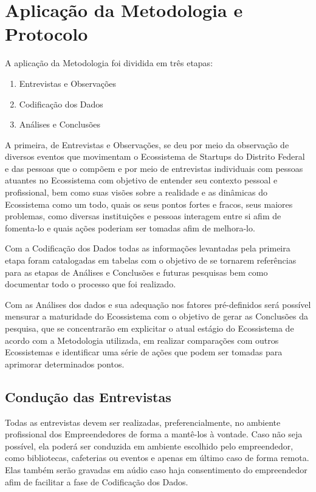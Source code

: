\section{Aplicação da Metodologia e Protocolo}
\label{subsection:aplicacao_da_metodologia}

A aplicação da Metodologia foi dividida em três etapas:

\begin{enumerate}
  \item Entrevistas e Observações
  \item Codificação dos Dados
  \item Análises e Conclusões
\end{enumerate}

A primeira, de Entrevistas e Observações, se deu por meio da observação de diversos eventos que movimentam o Ecossistema de Startups do Distrito Federal e das pessoas que o compõem e por meio de entrevistas individuais com pessoas atuantes no Ecossistema com objetivo de entender seu contexto pessoal e profissional, bem como suas visões sobre a realidade e as dinâmicas do Ecossistema como um todo, quais os seus pontos fortes e fracos, seus maiores problemas, como diversas instituições e pessoas interagem entre si afim de fomenta-lo e quais ações poderiam ser tomadas afim de melhora-lo.

Com a Codificação dos Dados todas as informações levantadas pela primeira etapa foram catalogadas em tabelas com o objetivo de se tornarem referências para as etapas de Análises e Conclusões e futuras pesquisas bem como documentar todo o processo que foi realizado. 

Com as Análises dos dados e sua adequação nos fatores pré-definidos será possível mensurar a maturidade do Ecossistema com o objetivo de gerar as Conclusões da pesquisa, que se concentrarão em explicitar o atual estágio do Ecossistema de acordo com a Metodologia utilizada, em realizar comparações com outros Ecossistemas e identificar uma série de ações que podem ser tomadas para aprimorar determinados pontos.

\subsection{Condução das Entrevistas}
\label{subsection:conducao_das_entrevistas}

Todas as entrevistas devem ser realizadas, preferencialmente, no ambiente profissional dos Empreendedores de forma a mantê-los à vontade. Caso não seja possível, ela poderá ser conduzida em ambiente escolhido pelo empreendedor, como bibliotecas, cafeterias ou eventos e apenas em último caso de forma remota. Elas também serão gravadas em aúdio caso haja consentimento do empreendedor afim de facilitar a fase de Codificação dos Dados.

